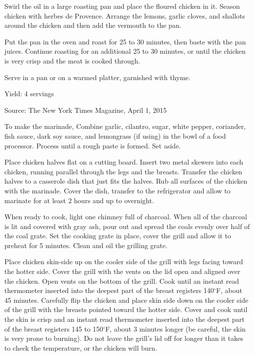 \documentclass[letterpaper]{recipePMG}
\renewcommand{\deg}{$^\circ$}
\begin{document}
Swirl the oil in a large roasting pan and place the floured chicken in it. Season chicken with herbes de Provence. Arrange the lemons, garlic cloves, and shallots around the chicken and then add the vermouth to the pan.

Put the pan in the oven and roast for 25 to 30 minutes, then baste with the pan juices. Continue roasting for an additional 25 to 30 minutes, or until the chicken is very crisp and the meat is cooked through.

Serve in a pan or on a warmed platter, garnished with thyme.

Yield: 4 servings

Source: The New York Times Magazine, April 1, 2015


\newpage
{}
\label{GaiYang}

To make the marinade, Combine garlic, cilantro, sugar, white pepper, coriander, fish sauce, dark soy sauce, and lemongrass (if using) in the bowl of a food processor. Process until a rough paste is formed. Set aside.

Place chicken halves flat on a cutting board. Insert two metal skewers into each chicken, running parallel through the legs and the breasts. Transfer the chicken halves to a casserole dish that just fits the halves. Rub all surfaces of the chicken with the marinade. Cover the dish, transfer to the refrigerator and allow to marinate for at least 2 hours and up to overnight.

When ready to cook, light one chimney full of charcoal. When all of the charcoal is lit and covered with gray ash, pour out and spread the coals evenly over half of the coal grate. Set the cooking grate in place, cover the grill and allow it to preheat for 5 minutes. Clean and oil the grilling grate.

Place chicken skin-side up on the cooler side of the grill with legs facing toward the hotter side. Cover the grill with the vents on the lid open and aligned over the chicken. Open vents on the bottom of the grill. Cook until an instant read thermometer inserted into the deepest part of the breast registers 140\deg F, about 45 minutes. Carefully flip the chicken and place skin side down on the cooler side of the grill with the breasts pointed toward the hotter side. Cover and cook until the skin is crisp and an instant read thermometer inserted into the deepest part of the breast registers 145 to 150\deg F, about 3 minutes longer (be careful, the skin is very prone to burning). Do not leave the grill's lid off for longer than it takes to check the temperature, or the chicken will burn.
\end{document}
